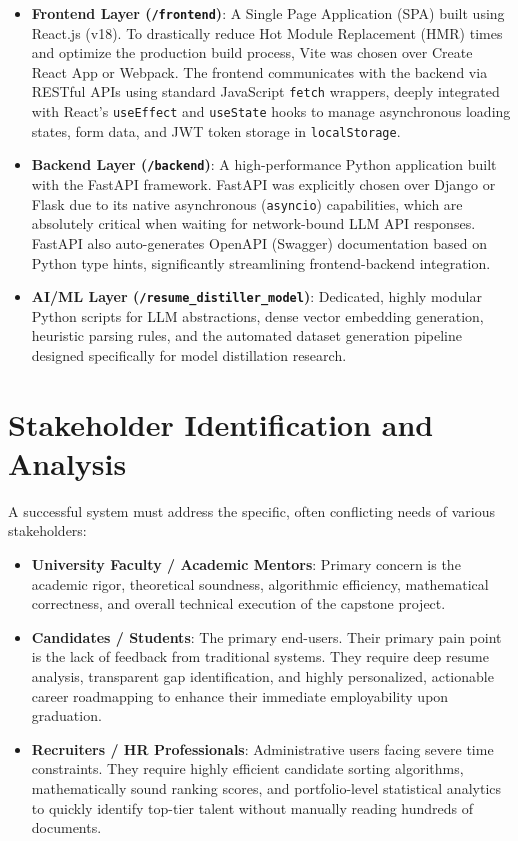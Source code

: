 \documentclass[12pt,a4paper]{report}
\begin{document}
\begin{itemize}
    \item \textbf{Frontend Layer (\texttt{/frontend})}: A Single Page Application (SPA) built using React.js (v18). To drastically reduce Hot Module Replacement (HMR) times and optimize the production build process, Vite was chosen over Create React App or Webpack. The frontend communicates with the backend via RESTful APIs using standard JavaScript \texttt{fetch} wrappers, deeply integrated with React's \texttt{useEffect} and \texttt{useState} hooks to manage asynchronous loading states, form data, and JWT token storage in \texttt{localStorage}.
    \item \textbf{Backend Layer (\texttt{/backend})}: A high-performance Python application built with the FastAPI framework. FastAPI was explicitly chosen over Django or Flask due to its native asynchronous (\texttt{asyncio}) capabilities, which are absolutely critical when waiting for network-bound LLM API responses. FastAPI also auto-generates OpenAPI (Swagger) documentation based on Python type hints, significantly streamlining frontend-backend integration.
    \item \textbf{AI/ML Layer (\texttt{/resume\_distiller\_model})}: Dedicated, highly modular Python scripts for LLM abstractions, dense vector embedding generation, heuristic parsing rules, and the automated dataset generation pipeline designed specifically for model distillation research.
\end{itemize}

\section{Stakeholder Identification and Analysis}

A successful system must address the specific, often conflicting needs of various stakeholders:
\begin{itemize}
    \item \textbf{University Faculty / Academic Mentors}: Primary concern is the academic rigor, theoretical soundness, algorithmic efficiency, mathematical correctness, and overall technical execution of the capstone project.
    \item \textbf{Candidates / Students}: The primary end-users. Their primary pain point is the lack of feedback from traditional systems. They require deep resume analysis, transparent gap identification, and highly personalized, actionable career roadmapping to enhance their immediate employability upon graduation.
    \item \textbf{Recruiters / HR Professionals}: Administrative users facing severe time constraints. They require highly efficient candidate sorting algorithms, mathematically sound ranking scores, and portfolio-level statistical analytics to quickly identify top-tier talent without manually reading hundreds of documents.
\end{itemize}
\end{document}
